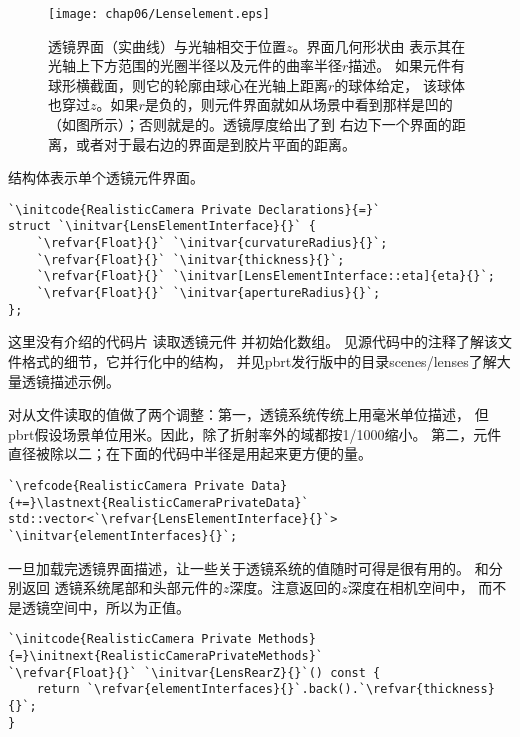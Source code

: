 \begin{figure}[htbp]
    \centering\texttt{[image: chap06/Lenselement.eps]}
    \caption{透镜界面（实曲线）与光轴相交于位置$z$。界面几何形状由
        表示其在光轴上下方范围的光圈半径以及元件的曲率半径$r$描述。
        如果元件有球形横截面，则它的轮廓由球心在光轴上距离$r$的球体给定，
        该球体也穿过$z$。如果$r$是负的，则元件界面就如从场景中看到那样是凹的
        （如图所示）；否则就是\protect{}的。透镜厚度给出了到
        右边下一个界面的距离，或者对于最右边的界面是到胶片平面的距离。}
    \label{fig:6.17}
\end{figure}

结构体表示单个透镜元件界面。
\begin{lstlisting}
`\initcode{RealisticCamera Private Declarations}{=}`
struct `\initvar{LensElementInterface}{}` {
    `\refvar{Float}{}` `\initvar{curvatureRadius}{}`;
    `\refvar{Float}{}` `\initvar{thickness}{}`;
    `\refvar{Float}{}` `\initvar[LensElementInterface::eta]{eta}{}`;
    `\refvar{Float}{}` `\initvar{apertureRadius}{}`;
};
\end{lstlisting}

这里没有介绍的代码片
读取透镜元件
并初始化数组。
见源代码中的注释了解该文件格式的细节，它并行化中的结构，
并见pbrt发行版中的目录{\ttfamily scenes/lenses}了解大量透镜描述示例。

对从文件读取的值做了两个调整：第一，透镜系统传统上用毫米单位描述，
但pbrt假设场景单位用米。因此，除了折射率外的域都按1/1000缩小。
第二，元件直径被除以二；在下面的代码中半径是用起来更方便的量。
\begin{lstlisting}
`\refcode{RealisticCamera Private Data}{+=}\lastnext{RealisticCameraPrivateData}`
std::vector<`\refvar{LensElementInterface}{}`> `\initvar{elementInterfaces}{}`;
\end{lstlisting}

一旦加载完透镜界面描述，让一些关于透镜系统的值随时可得是很有用的。
和分别返回
透镜系统尾部和头部元件的$z$深度。注意返回的$z$深度在相机空间中，
而不是透镜空间中，所以为正值。
\begin{lstlisting}
`\initcode{RealisticCamera Private Methods}{=}\initnext{RealisticCameraPrivateMethods}`
`\refvar{Float}{}` `\initvar{LensRearZ}{}`() const {
    return `\refvar{elementInterfaces}{}`.back().`\refvar{thickness}{}`;
}
\end{lstlisting}

